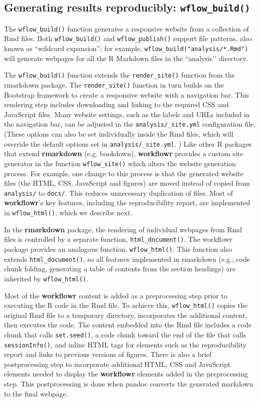 \documentclass[9pt,a4paper]{extarticle}
\begin{document}
\subsection*{Generating results reproducibly: \texttt{wflow\_build()}}

The \texttt{wflow\_build()} function generates a responsive website from a
collection of Rmd files. Both \texttt{wflow\_build()} and \texttt{wflow\_publish()} support
file patterns, also known as “wildcard expansion”; for example,
\texttt{wflow\_build("analysis/*.Rmd")} will generate webpages for all
the R Markdown files in the ``analysis’’ directory.

The \texttt{wflow\_build()} function extends the \texttt{render\_site()} function from the
rmarkdown package. The \texttt{render\_site()} function in turn builds on the
Bootstrap framework to create a responsive website with a navigation
bar. This rendering step includes downloading and linking to the
required CSS and JavaScript files. Many website settings, such as the
labels and URLs included in the navigation bar, can be adjusted in the
\verb|analysis/_site.yml| configuration file. (These options can also be
set individually inside the Rmd files, which will override the default
options set in \texttt{analysis/\_site.yml}. ) Like other R packages
that extend \textbf{rmarkdown} (e.g. bookdown), \textbf{workflowr} provides a custom site
generator in the function \texttt{wflow\_site()} which alters the website
generation process. For example, one change to this process is that the
generated website files (the HTML, CSS, JavaScript and figures) are
moved instead of copied from \verb|analysis/| to \verb|docs/|. This
reduces unnecessary duplication of files. Most of \textbf{workflowr}’s key
features, including the reproducibility report, are implemented in
\texttt{wflow\_html()}, which we describe next.

In the \textbf{rmarkdown} package, the rendering of individual webpages from Rmd
files is controlled by a separate function, \texttt{html\_document()}. The
workflowr package provides an analogous function, \texttt{wflow\_html()}. This
function also extends \texttt{html\_document()}, so all features implemented in
rmarkdown (e.g., code chunk folding, generating a table of contents from
the section headings) are inherited by \texttt{wflow\_html()}.

Most of the \textbf{workflowr} content is added as a preprocessing step prior to
executing the R code in the Rmd file. To achieve this, \texttt{wflow\_html()}
copies the original Rmd file to a temporary directory, incorporates the
additional content, then executes the code. The content embedded into
the Rmd file includes a code chunk that calls \texttt{set.seed()}, a code chunk
toward the end of the file that calls \texttt{sessionInfo()}, and inline HTML
tags for elements such as the reproducibility report and links to
previous versions of figures. There is also a brief postprocessing step
to incorporate additional HTML, CSS and JavaScript elements needed to
display the \textbf{workflowr} elements added in the preprocessing step. This
postprocessing is done when pandoc converts the generated markdown to
the final webpage.
\end{document}
